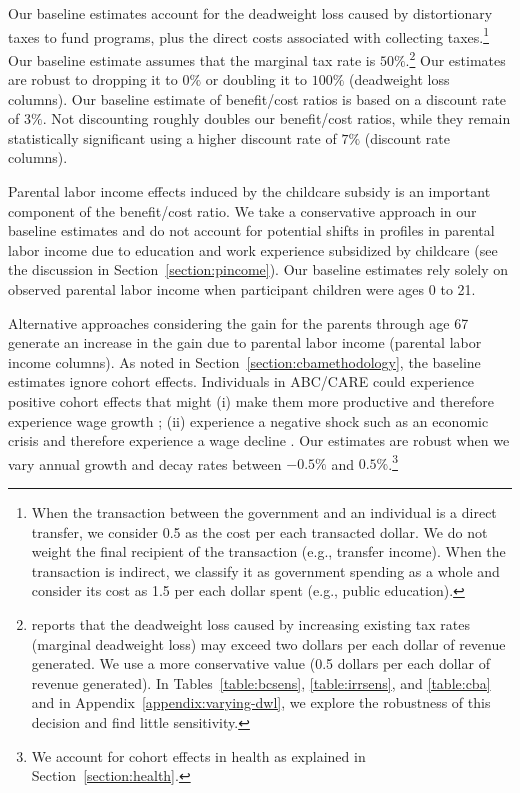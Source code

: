 Our baseline estimates account for the deadweight loss caused by distortionary taxes to fund programs, plus the direct costs associated with collecting taxes.\footnote{When the transaction between the government and an individual is a direct transfer, we consider 0.5 as the cost per each transacted dollar. We do not weight the final recipient of the transaction (e.g., transfer income). When the transaction is indirect, we classify it as government spending as a whole and consider its cost as 1.5 per each dollar spent (e.g., public education).} Our baseline estimate assumes that the marginal tax rate is $50\%$.\footnote{\citet{Feldstein_1999_REStat} reports that the deadweight loss caused by increasing existing tax rates (marginal deadweight loss) may exceed two dollars per each dollar of revenue generated. We use a more conservative value (0.5 dollars per each dollar of revenue generated). In Tables~\ref{table:bcsens}, \ref{table:irrsens}, and \ref{table:cba} and in  Appendix~\ref{appendix:varying-dwl}, we explore the robustness of this decision and find little sensitivity.} Our estimates are robust to dropping it to $0\%$ or doubling it to $100\%$ (deadweight loss columns). Our baseline estimate of benefit/cost ratios is based on a discount rate of $3\%$. Not discounting roughly doubles our benefit/cost ratios, while they remain statistically significant using a higher discount rate of $7\%$ (discount rate columns).

Parental labor income effects induced by the childcare subsidy is an important component of the benefit/cost ratio. We take a conservative approach in our baseline estimates and do not account for potential shifts in profiles in parental labor income due to education and work experience subsidized by childcare (see the discussion in Section~\ref{section:pincome}). Our baseline estimates rely solely on observed parental labor income when participant children were ages 0 to 21.

Alternative approaches considering the gain for the parents through age 67 generate an increase in the gain due to parental labor income (parental labor income columns). As noted in Section~\ref{section:cbamethodology}, the baseline estimates ignore cohort effects. Individuals in ABC/CARE could experience positive cohort effects that might (i) make them more productive and therefore experience wage growth \citep{Lagakos_Moll_etal_2016_LifeCycle_NBER}; (ii) experience a negative shock such as an economic crisis and therefore experience a wage decline \citep{Jarosch_2016_JobSecurity_Econometrica}. Our estimates are robust when we vary annual growth and decay rates between $-0.5\%$ and $0.5\%$.\footnote{We account for cohort effects in health as explained in Section~\ref{section:health}.}

